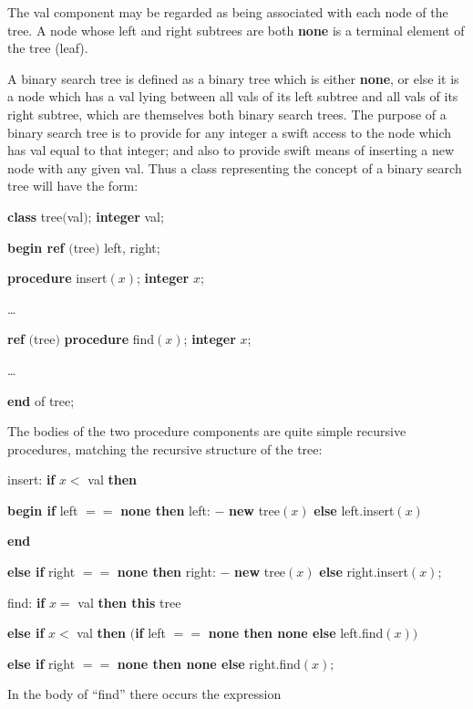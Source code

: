 \noindent
The val component may be regarded as being associated with each node of the tree. A node whose left and right subtrees are both \textbf{none} is a terminal element of the tree (leaf).

A binary search tree is defined as a binary tree which is either \textbf{none}, or else it is a node which has a val lying between all vals of its left subtree and all vals of its right subtree, which are themselves both binary search trees. The purpose of a binary search tree is to provide for any integer a swift access to the node which has val equal to that integer; and also to provide swift means of inserting a new node with any given val. Thus a class representing the concept of a binary search tree will have the form:

\quad \textbf{class} tree$($val$)$; \textbf{integer} val;

\quad \quad \textbf{begin ref} $($tree$)$ left, right;

\quad \quad \quad \textbf{procedure} insert$(x)$; \textbf{integer} $x$;

\quad \quad \quad \quad \dots

\quad \quad \quad \textbf{ref} $($tree$)$ \textbf{procedure} find$(x)$; \textbf{integer} $x$;

\quad \quad \quad \quad \dots

\quad \quad \textbf{end} of tree;

The bodies of the two procedure components are quite simple recursive procedures, matching the recursive structure of the tree:

\quad insert: \textbf{if} $x <$ val \textbf{then}

\quad \quad \textbf{begin if} left $==$ \textbf{none then} left: $-$ \textbf{new} tree$(x)$ \textbf{else} left.insert$(x)$

\quad \quad \textbf{end}

\quad \textbf{else if} right $==$ \textbf{none then} right: $-$ \textbf{new} tree$(x)$ \textbf{else} right.insert$(x)$;
\smallskip

\quad find: \textbf{if} $x =$ val \textbf{then this} tree

\quad \textbf{else if} $x <$ val \textbf{then} $($\textbf{if} left $==$ \textbf{none then none else} left.find$(x))$

\quad \textbf{else if} right $==$ \textbf{none then none else} right.find$(x);$

\noindent
In the body of ``find'' there occurs the expression

